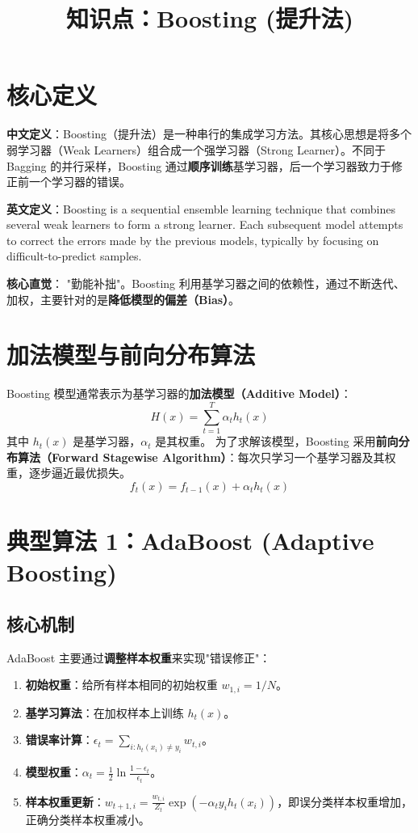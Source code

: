 \documentclass[12pt, a4paper]{article}
\title{知识点：Boosting (提升法)}
\author{}
\date{}
\begin{document}
\maketitle

\section{核心定义}
\textbf{中文定义}：Boosting（提升法）是一种串行的集成学习方法。其核心思想是将多个弱学习器（Weak Learners）组合成一个强学习器（Strong Learner）。不同于 Bagging 的并行采样，Boosting 通过\textbf{顺序训练}基学习器，后一个学习器致力于修正前一个学习器的错误。

\textbf{英文定义}：Boosting is a sequential ensemble learning technique that combines several weak learners to form a strong learner. Each subsequent model attempts to correct the errors made by the previous models, typically by focusing on difficult-to-predict samples.

\textbf{核心直觉}：
"勤能补拙"。Boosting 利用基学习器之间的依赖性，通过不断迭代、加权，主要针对的是\textbf{降低模型的偏差（Bias）}。

\section{加法模型与前向分布算法}
Boosting 模型通常表示为基学习器的\textbf{加法模型（Additive Model）}：
$$ H(x) = \sum_{t=1}^T \alpha_t h_t(x) $$
其中 $h_{t}(x)$ 是基学习器，$\alpha_t$ 是其权重。
为了求解该模型，Boosting 采用\textbf{前向分布算法（Forward Stagewise Algorithm）}：每次只学习一个基学习器及其权重，逐步逼近最优损失。
$$ f_t(x) = f_{t-1}(x) + \alpha_t h_t(x) $$

\section{典型算法 1：AdaBoost (Adaptive Boosting)}

\subsection{核心机制}
AdaBoost 主要通过\textbf{调整样本权重}来实现"错误修正"：
\begin{enumerate}
    \item \textbf{初始权重}：给所有样本相同的初始权重 $w_{1,i} = 1/N$。
    \item \textbf{基学习算法}：在加权样本上训练 $h_t(x)$。
    \item \textbf{错误率计算}：$\epsilon_t = \sum_{i: h_t(x_i) \neq y_i} w_{t,i}$。
    \item \textbf{模型权重}：$\alpha_t = \frac{1}{2} \ln \frac{1-\epsilon_t}{\epsilon_t}$。
    \item \textbf{样本权重更新}：$w_{t+1, i} = \frac{w_{t,i}}{Z_t} \exp(-\alpha_t y_i h_t(x_i))$，即误分类样本权重增加，正确分类样本权重减小。
\end{enumerate}
\end{document}
